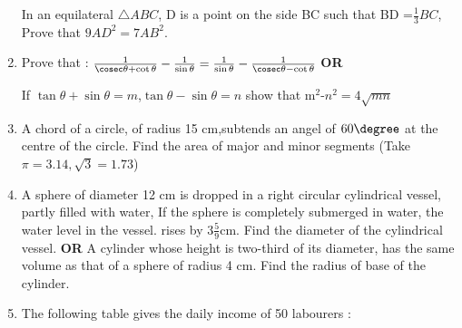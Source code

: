 \documentclass[journal,12pt,twocolumn]{IEEEtran}
\renewcommand\thesection{\arabic{section}}
\begin{document}
\begin{enumerate}[label=\thesection.\arabic*.,ref=\thesection.\theenumi]
In an equilateral $\triangle ABC$, D is a point on the side BC such that BD =$\frac{1}{3}BC$, Prove that $9AD^2 =7AB^2.$\\

\item Prove that : $\frac{1}{\cosec\theta + \cot\theta}-\frac{1}{\sin\theta}=\frac{1}{\sin\theta}-\frac{1}{\cosec\theta-\cot\theta}$
{\centering 
\newline \textbf{OR}}

If $\tan\theta + \sin\theta = m$,$\tan\theta-\sin\theta=n$ show that m$^2$-$n^2=4\sqrt{mn}$
\item A chord of a circle, of radius 15 cm,subtends an angel of $60\degree$ at the centre of the circle. Find the area of major and minor segments (Take $\pi=3.14, \sqrt{3}=1.73$)
\item A sphere of diameter 12 cm is dropped in a right circular cylindrical vessel, partly filled with water, If the sphere is completely submerged in water, the water level in the vessel. rises by $3\frac{5}{9}$cm. Find the diameter of the cylindrical vessel.
\newline \textbf{OR} \newline
A cylinder whose height is two-third of its diameter, has the same volume as that of a sphere of radius 4 cm. Find the radius of base of the cylinder.
\item The following table gives the daily income of 50 labourers :\\


\end{enumerate}
\end{document}

